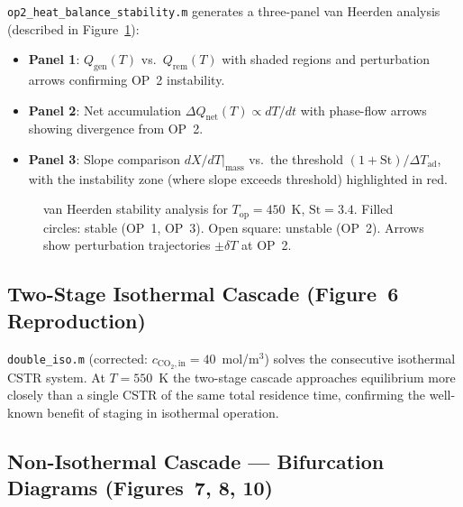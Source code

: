 \documentclass[11pt,a4paper]{article}
\newcommand{\dTad}{\Delta T_{\mathrm{ad}}}
\newcommand{\Top}{T_{\mathrm{op}}}
\newcommand{\St}{\mathrm{St}}
\newcommand{\cin}{c_{\mathrm{CO_2,in}}}
\begin{document}
\texttt{op2\_heat\_balance\_stability.m} generates a three-panel
van Heerden analysis (described in Figure~\ref{fig:vanheerden}):

\begin{itemize}[itemsep=1pt,leftmargin=1.6em]
  \item \textbf{Panel 1}: $Q_{\mathrm{gen}}(T)$ vs.\ $Q_{\mathrm{rem}}(T)$
        with shaded regions and perturbation arrows confirming OP~2 instability.
  \item \textbf{Panel 2}: Net accumulation $\Delta Q_{\mathrm{net}}(T)\propto dT/dt$
        with phase-flow arrows showing divergence from OP~2.
  \item \textbf{Panel 3}: Slope comparison $dX/dT\big|_\mathrm{mass}$ vs.\ the
        threshold $(1+\St)/\dTad$, with the instability zone (where slope exceeds
        threshold) highlighted in red.
\end{itemize}

\begin{figure}[h!]
  \centering
  \caption{van Heerden stability analysis for $\Top=450$~K, $\St=3.4$.
           Filled circles: stable (OP~1, OP~3).  Open square: unstable (OP~2).
           Arrows show perturbation trajectories $\pm\delta T$ at OP~2.}
  \label{fig:vanheerden}
\end{figure}

\subsection{Two-Stage Isothermal Cascade (Figure~6 Reproduction)}

\texttt{double\_iso.m} (corrected: $\cin=40$~mol/m$^3$) solves the
consecutive isothermal CSTR system.  At $T=550$~K the two-stage cascade
approaches equilibrium more closely than a single CSTR of the same total
residence time, confirming the well-known benefit of staging in isothermal
operation.

\subsection{Non-Isothermal Cascade — Bifurcation Diagrams (Figures~7, 8, 10)}
\end{document}

